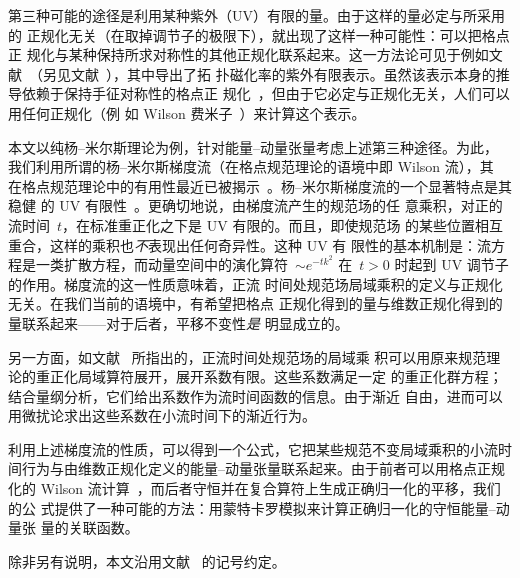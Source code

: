 第三种可能的途径是利用某种紫外（UV）有限的量。由于这样的量必定与所采用的
正规化无关（在取掉调节子的极限下），就出现了这样一种可能性：可以把格点正
规化与某种保持所求对称性的其他正规化联系起来。这一方法论可见于例如文
献~\cite{Luscher:2004fu}（另见文献~\cite{Luscher:2010ik}），其中导出了拓
扑磁化率的紫外有限表示。虽然该表示本身的推导依赖于保持手征对称性的格点正
规化~\cite{Kaplan:1992bt,Neuberger:1997fp,Hasenfratz:1997ft,%
Hasenfratz:1998ri,Neuberger:1998wv,Hasenfratz:1998jp,Luscher:1998pqa,%
Niedermayer:1998bi}，但由于它必定与正规化无关，人们可以用任何正规化（例
如 Wilson 费米子~\cite{Wilson:1975hf}）来计算这个表示。

本文以纯杨--米尔斯理论为例，针对能量--动量张量考虑上述第三种途径。为此，
我们利用所谓的杨--米尔斯梯度流（在格点规范理论的语境中即 Wilson 流），其
在格点规范理论中的有用性最近已被揭示~\cite{Luscher:2010iy,Luscher:2010we,%
Luscher:2011bx,Borsanyi:2012zs,Borsanyi:2012zr,Fodor:2012td,Fodor:2012qh,%
Fritzsch:2013je,Luscher:2013cpa}。杨--米尔斯梯度流的一个显著特点是其稳健
的 UV 有限性~\cite{Luscher:2011bx}。更确切地说，由梯度流产生的规范场的任
意乘积，对正的流时间~$t$，在标准重正化之下是 UV 有限的。而且，即使规范场
的某些位置相互重合，这样的乘积也\emph{不\/}表现出任何奇异性。这种 UV 有
限性的基本机制是：流方程是一类扩散方程，而动量空间中的演化算符~$\sim
e^{-tk^2}$ 在~$t>0$ 时起到 UV 调节子的作用。梯度流的这一性质意味着，正流
时间处规范场局域乘积的定义与正规化无关。在我们当前的语境中，有希望把格点
正规化得到的量与维数正规化得到的量联系起来——对于后者，平移不变性\emph{是\/}
明显成立的。

另一方面，如文献~\cite{Luscher:2011bx} 所指出的，正流时间处规范场的局域乘
积可以用原来规范理论的重正化局域算符展开，展开系数有限。这些系数满足一定
的重正化群方程；结合量纲分析，它们给出系数作为流时间函数的信息。由于渐近
自由，进而可以用微扰论求出这些系数在小流时间下的渐近行为。

利用上述梯度流的性质，可以得到一个公式，它把某些规范不变局域乘积的小流时
间行为与由维数正规化定义的能量--动量张量联系起来。由于前者可以用格点正规
化的 Wilson 流计算~\cite{Luscher:2010iy,Luscher:2010we,Luscher:2011bx,%
Borsanyi:2012zs,Borsanyi:2012zr,Fodor:2012td,Fodor:2012qh,Fritzsch:2013je,%
Luscher:2013cpa}，而后者守恒并在复合算符上生成正确归一化的平移，我们的公
式提供了一种可能的方法：用蒙特卡罗模拟来计算正确归一化的守恒能量--动量张
量的关联函数。

除非另有说明，本文沿用文献~\cite{Luscher:2011bx} 的记号约定。
